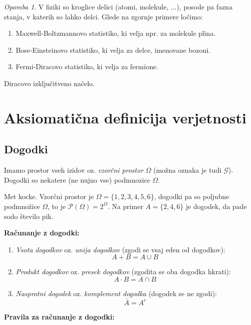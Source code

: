 \documentclass[12pt]{book}
\def\n{\noindent}
\theoremstyle{definition}
\theoremstyle{plain}
\theoremstyle{plain}
\theoremstyle{plain}
\theoremstyle{remark}
\newtheorem*{opomba}{Opomba}
\begin{document}
\begin{opomba}
V fiziki so kroglice delici (atomi, molekule, ...), posode pa fazna stanja, v katerih so lahko delci. Glede na zgornje primere ločimo:
\begin{enumerate}
    \item Maxwell-Boltzmannovo statistiko, ki velja npr. za molekule plina.
    \item Bose-Einsteinovo statistiko, ki velja za delce, imenovane bozoni.
    \item Fermi-Diracovo statistiko, ki velja za fermione. 
\end{enumerate}

\n Diracovo izključitveno načelo.

\end{opomba}

\chapter{Aksiomatična definicija verjetnosti}

\section{Dogodki}

Imamo prostor vseh izidov oz. \emph{vzorčni prostor} $\Omega$ (možna oznaka je tudi $\mathcal{G}$). Dogodki so nekatere (ne nujno vse) podmnozice $\Omega$.

\begin{zgled}
    Met kocke. Vzorčni prostor je $\Omega=\{1,2,3,4,5,6\}$, dogodki pa so poljubne podmnožice $\Omega$, to je $\mathcal{P}(\Omega) = 2^{\Omega}$. Na primer $A = \{2,4,6\}$ je dogodek, da pade sodo število pik. 
\end{zgled}

\n \textbf{Računanje z dogodki:}

\begin{enumerate}
    \item \emph{Vsota dogodkov} oz. \emph{unija dogodkov} (zgodi se vsaj eden od dogodkov): $$A + B = A \cup B$$
    \item \emph{Produkt dogodkov} oz. \emph{presek dogodkov} (zgodita se oba dogodka hkrati): $$A \cdot B = A \cap B$$
    \item \emph{Nasprotni dogodek} oz. \emph{komplement dogodka} (dogodek se ne zgodi): $$\bar A = A^c$$
\end{enumerate}

\n \textbf{Pravila za računanje z dogodki:} 
\end{document}
